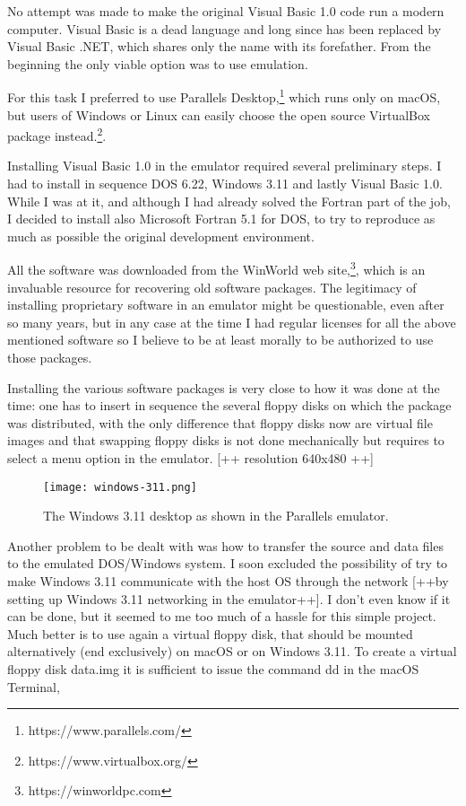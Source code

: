 No attempt was made to make the original Visual Basic 1.0 code run a modern computer. Visual Basic is a dead language and long since has been replaced by Visual Basic .NET, which shares only the name with its forefather. From the beginning the only viable option was to use emulation. 

For this task I preferred to use Parallels Desktop,\footnote{https://www.parallels.com/} which runs only on macOS, but users of Windows or Linux can easily choose the open source VirtualBox package instead.\footnote{https://www.virtualbox.org/}.

Installing Visual Basic 1.0 in the emulator required several preliminary steps. I had to install in sequence DOS 6.22, Windows 3.11 and lastly Visual Basic 1.0.
While I was at it, and although I had already solved the Fortran part of the job, I decided to install also Microsoft Fortran 5.1 for DOS, to try to reproduce as much as possible the original development environment.

All the software was downloaded from the WinWorld web site,\footnote{https://winworldpc.com}, which is an invaluable resource for recovering old software packages. The legitimacy of installing proprietary software in an emulator might be questionable, even after so many years, but in any case at the time I had regular licenses for all the above mentioned software so I believe to be at least morally to be authorized to use those packages.

Installing the various software packages is very close to how it was done at the time: one has to insert in sequence the several floppy disks on which the package was distributed, with the only difference that floppy disks now are virtual file images and that swapping floppy disks is not done mechanically but requires to select a menu option in the emulator. [++ resolution 640x480 ++]

\begin{figure}[tbh]
	\centering
	\texttt{[image: windows-311.png]}
	\caption{The Windows 3.11 desktop as shown in the Parallels emulator.}
	\label{fig:windows-311}
\end{figure}


Another problem to be dealt with was how to transfer the source and data files to the emulated DOS/Windows system.
I soon excluded the possibility of try to make Windows 3.11 communicate with the host OS through the network [++by setting up Windows 3.11 networking in the emulator++].
I don't even know if it can be done, but it seemed to me too much of a hassle for this simple project.
Much better is to use again a virtual floppy disk, that should be mounted alternatively (end exclusively) on macOS or on Windows 3.11. 
To create a virtual floppy disk \textsf{data.img} it is sufficient to issue the command \textsf{dd} in the macOS Terminal,

